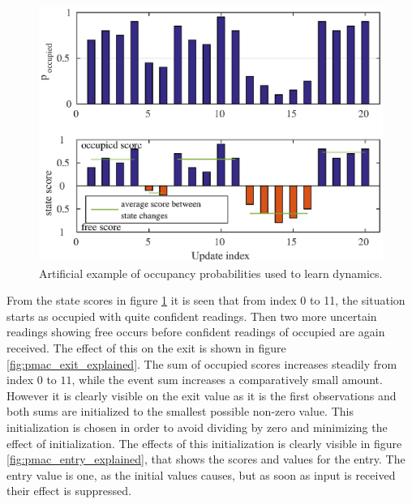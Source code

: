 \begin{figure} [htbp]
    \centering
    \includegraphics[scale=1]{chapters/mapping_of_dynamic_areas/figures/state_scores_explained}
    \caption{Artificial example of occupancy probabilities used to learn dynamics.}
    \label{fig:state_scores_explained}
\end{figure}

From the state scores in figure \ref{fig:state_scores_explained} it is seen that from index 0 to 11, the situation starts as occupied with quite confident readings. Then two more uncertain readings showing free occurs before confident readings of occupied are again received. The effect of this on the exit is shown in figure \ref{fig:pmac_exit_explained}. The sum of occupied scores increases steadily from index $0$ to $11$, while the event sum increases a comparatively small amount. However it is clearly visible on the exit value as it is the first observations and both sums are initialized to the smallest possible non-zero value. This initialization is chosen in order to avoid dividing by zero and minimizing the effect of initialization. The effects of this initialization is clearly visible in figure \ref{fig:pmac_entry_explained}, that shows the scores and values for the entry. The entry value is one, as the initial values causes, but as soon as input is received their effect is suppressed.

